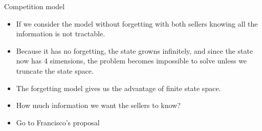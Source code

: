 \documentclass[10pt]{beamer}
\begin{document}
\begin{frame}{Competition model}
    \begin{itemize}[<+->]
        \item If we consider the model without forgetting with both sellers knowing all the information is not tractable. 
        \item Because it has no forgetting, the state growns infinitely, and since the state now has 4 simensions, the problem becomes impossible to solve unless we truncate the state space. 
        \item The forgetting model gives us the advantage of finite state space.
        \item How much information we want the sellers to know? 
        \item Go to Francisco's proposal 
    \end{itemize}
    
\end{frame}
\end{document}
